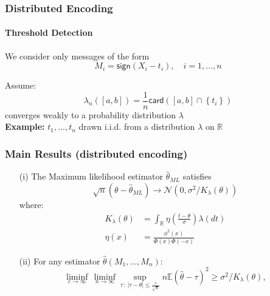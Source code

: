 \documentclass[mathserif]{beamer}
\newcommand{\sgn}{\mathsf{sign}}
\begin{document}
\begin{frame}
\frametitle{Distributed Encoding}
\framesubtitle{Threshold Detection}
We consider only messages of the form
\[
M_i = \sgn(X_i - t_i),\quad i=1,\ldots,n
\]
\begin{center}
\pause
{}
\end{center}
Assume:
\[
\lambda_n([a,b]) = \frac{1}{n} \mathsf{card}\left( [a,b]  \cap \left\{t_i \right\} \right)
\]
converges weakly to a probability distribution $\lambda$
\\
\bigskip
\pause
\textbf{Example:} $t_1,\ldots,t_n$ drawn i.i.d. from a distribution $\lambda$ on $\mathbb R$ 

\end{frame}

\begin{frame}
\frametitle{Main Results (distributed encoding)}

\begin{theorem}
\begin{itemize}
\item[(i)] The Maximum likelihood estimator $\widehat{\theta}_{ML}$  satisfies
\[
\sqrt{n}(\theta - \widehat{\theta}_{ML}) \rightarrow \mathcal N\left(0,\sigma^2/K_\lambda(\theta) \right)
\]
where:
\begin{align*}
K_\lambda(\theta) & = \int_{\mathbb R} \eta\left( \frac{t-\theta}{\sigma}\right) \lambda(dt) \\
\eta(x) & = \frac{\phi^2(x)}{\Phi(x)\Phi(-x)}
\end{align*}
\pause
\item[(ii)] For any estimator $\widehat{\theta}(M_1,\ldots,M_n)$:
\[
\liminf_{c\rightarrow \infty}\, \liminf_{n\rightarrow \infty} \sup_{\tau\,:\,| \tau - \theta| \leq \frac{c}{\sqrt{n}} }  n \mathbb E \left(\widehat{\theta} - \tau \right)^2 \geq \sigma^2/K_\lambda(\theta),
\]

\end{itemize}
\end{theorem}
\end{frame}
\end{document}
